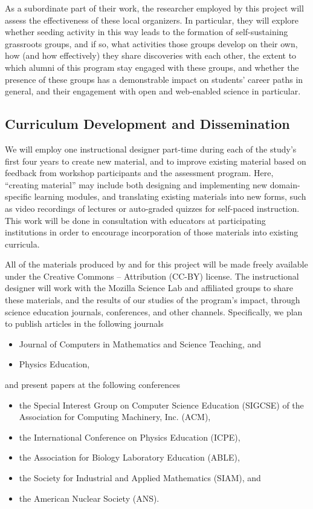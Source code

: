\documentclass[11pt]{article}
\begin{document}
As a subordinate part of their work, the researcher employed by this
project will assess the effectiveness of these local organizers.  In
particular, they will explore whether seeding activity in this way
leads to the formation of self-sustaining grassroots groups, and if
so, what activities those groups develop on their own, how (and how
effectively) they share discoveries with each other, the extent to
which alumni of this program stay engaged with these groups, and
whether the presence of these groups has a demonstrable impact on
students' career paths in general, and their engagement with open and
web-enabled science in particular.

\subsection{Curriculum Development and Dissemination}

We will employ one instructional designer part-time during each of the
study's first four years to create new material, and to improve
existing material based on feedback from workshop participants and the
assessment program.  Here, ``creating material'' may include both
designing and implementing new domain-specific learning modules, and
translating existing materials into new forms, such as video
recordings of lectures or auto-graded quizzes for self-paced
instruction.  This work will be done in consultation with educators at
participating institutions in order to encourage incorporation of
those materials into existing curricula.

All of the materials produced by and for this project will be made
freely available under the Creative Commons -- Attribution (CC-BY)
license.  The instructional designer will work with the Mozilla
Science Lab and affiliated groups to share these materials, and the
results of our studies of the program's impact, through science
education journals, conferences, and other channels. Specifically, we plan to publish articles in the following journals 
\begin{itemize}
\item Journal of Computers in Mathematics and Science Teaching, and
%
\item Physics Education,
\end{itemize}
%
and present papers at the following conferences
\begin{itemize}
\item  the Special Interest Group on Computer Science Education (SIGCSE) of the Association for Computing Machinery, Inc. (ACM),
%
\item the International Conference on Physics Education (ICPE),
%
\item the Association for Biology Laboratory Education (ABLE),
%
\item the Society for Industrial and Applied Mathematics (SIAM), and
%
\item the American Nuclear Society (ANS).
\end{itemize}
\end{document}
